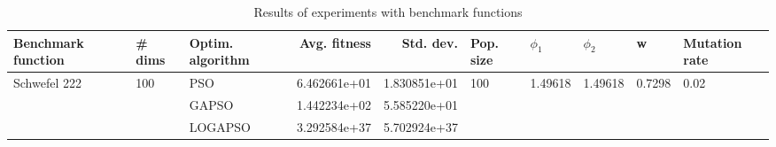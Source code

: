 \begin{table}
\centering
\caption{Results of experiments with benchmark functions}
\begin{tabular}{lllrrlllll}
\toprule
           Benchmark function &              \# dims & Optim. algorithm &  Avg. fitness &    Std. dev. &            Pop. size &               $\phi_{1}$ &               $\phi_{2}$ &                       w &         Mutation rate \\
\midrule
\multirow{3}{*}{Schwefel 222} & \multirow{3}{*}{100} &              PSO &  6.462661e+01 & 1.830851e+01 & \multirow{3}{*}{100} & \multirow{3}{*}{1.49618} & \multirow{3}{*}{1.49618} & \multirow{3}{*}{0.7298} & \multirow{3}{*}{0.02} \\
                              &                      &            GAPSO &  1.442234e+02 & 5.585220e+01 &                      &                          &                          &                         &                       \\
                              &                      &          LOGAPSO &  3.292584e+37 & 5.702924e+37 &                      &                          &                          &                         &                       \\
\bottomrule
\end{tabular}
\end{table}
